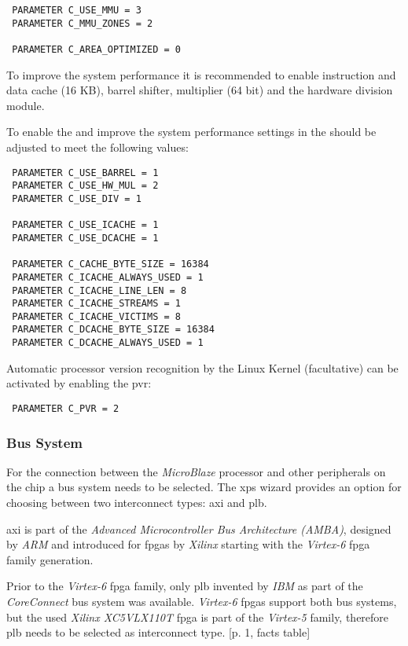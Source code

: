 \begin{verbatim}
 PARAMETER C_USE_MMU = 3
 PARAMETER C_MMU_ZONES = 2
 
 PARAMETER C_AREA_OPTIMIZED = 0
\end{verbatim}

To improve the system performance it is recommended to enable instruction and data cache (16 KB), barrel shifter, multiplier (64 bit) and the hardware division module.

To enable the  and improve the system performance settings  in the  should be adjusted to meet the following values:

\begin{verbatim}
 PARAMETER C_USE_BARREL = 1
 PARAMETER C_USE_HW_MUL = 2
 PARAMETER C_USE_DIV = 1

 PARAMETER C_USE_ICACHE = 1
 PARAMETER C_USE_DCACHE = 1

 PARAMETER C_CACHE_BYTE_SIZE = 16384
 PARAMETER C_ICACHE_ALWAYS_USED = 1
 PARAMETER C_ICACHE_LINE_LEN = 8
 PARAMETER C_ICACHE_STREAMS = 1
 PARAMETER C_ICACHE_VICTIMS = 8
 PARAMETER C_DCACHE_BYTE_SIZE = 16384
 PARAMETER C_DCACHE_ALWAYS_USED = 1
\end{verbatim}

Automatic processor version recognition by the Linux Kernel (facultative) can be activated by enabling the \gls{pvr}:

\begin{verbatim}
 PARAMETER C_PVR = 2
\end{verbatim}

\subsubsection{Bus System}

For the connection between the \textit{MicroBlaze} processor and other peripherals on the chip a bus system needs to be selected. The \gls{xps} wizard provides an option for choosing between two interconnect types: \gls{axi} and \gls{plb}.

\gls{axi} is part of the \textit{Advanced Microcontroller Bus Architecture (AMBA)}, designed by \textit{ARM} and introduced for \gls{fpga}s by \textit{Xilinx} starting with the \textit{Virtex-6} \gls{fpga} family generation.

Prior to the \textit{Virtex-6} \gls{fpga} family, only \gls{plb} invented by \textit{IBM} as part of the \textit{CoreConnect} bus system was available. \textit{Virtex-6} \gls{fpga}s support both bus systems, but the used \textit{Xilinx XC5VLX110T} \gls{fpga} is part of the \textit{Virtex-5} family, therefore \gls{plb} needs to be selected as interconnect type. \cite{axi_interconnect}[p. 1, facts table]

